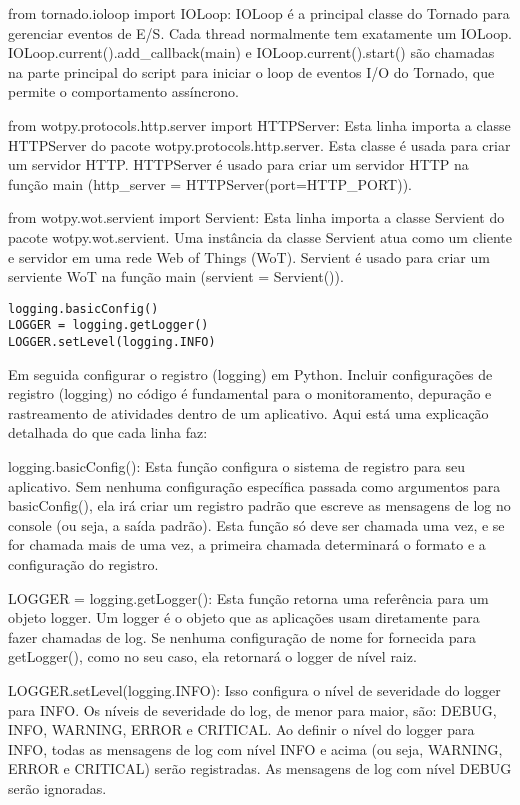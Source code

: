 from tornado.ioloop import IOLoop: 
IOLoop é a principal classe do Tornado para gerenciar eventos de E/S. Cada thread normalmente tem exatamente um IOLoop.
IOLoop.current().add\_callback(main) e IOLoop.current().start() são chamadas na parte principal do script para iniciar o loop de eventos I/O do Tornado, que permite o comportamento assíncrono.

from wotpy.protocols.http.server import HTTPServer:
Esta linha importa a classe HTTPServer do pacote wotpy.protocols.http.server. Esta classe é usada para criar um servidor HTTP.
HTTPServer é usado para criar um servidor HTTP na função main (http\_server = HTTPServer(port=HTTP\_PORT)).

from wotpy.wot.servient import Servient: 
Esta linha importa a classe Servient do pacote wotpy.wot.servient. Uma instância da classe Servient atua como um cliente e servidor em uma rede Web of Things (WoT).
Servient é usado para criar um serviente WoT na função main (servient = Servient()).

\begin{verbatim}
logging.basicConfig()
LOGGER = logging.getLogger()
LOGGER.setLevel(logging.INFO)
\end{verbatim}

Em seguida configurar o registro (logging) em Python. Incluir configurações de registro (logging) no código é fundamental para o monitoramento, depuração e rastreamento de atividades dentro de um aplicativo.  Aqui está uma explicação detalhada do que cada linha faz:

logging.basicConfig(): Esta função configura o sistema de registro para seu aplicativo. Sem nenhuma configuração específica passada como argumentos para basicConfig(), ela irá criar um registro padrão que escreve as mensagens de log no console (ou seja, a saída padrão). Esta função só deve ser chamada uma vez, e se for chamada mais de uma vez, a primeira chamada determinará o formato e a configuração do registro.

LOGGER = logging.getLogger(): Esta função retorna uma referência para um objeto logger. Um logger é o objeto que as aplicações usam diretamente para fazer chamadas de log. Se nenhuma configuração de nome for fornecida para getLogger(), como no seu caso, ela retornará o logger de nível raiz.

LOGGER.setLevel(logging.INFO): Isso configura o nível de severidade do logger para INFO. Os níveis de severidade do log, de menor para maior, são: DEBUG, INFO, WARNING, ERROR e CRITICAL. Ao definir o nível do logger para INFO, todas as mensagens de log com nível INFO e acima (ou seja, WARNING, ERROR e CRITICAL) serão registradas. As mensagens de log com nível DEBUG serão ignoradas.

